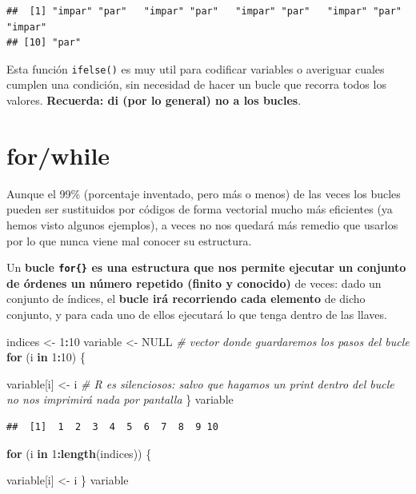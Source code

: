 \documentclass[11pt,]{book}
\newenvironment{Shaded}{\begin{snugshade}}{\end{snugshade}}
\newcommand{\CommentTok}[1]{\textcolor[rgb]{0.37,0.37,0.37}{\textit{#1}}}
\newcommand{\ControlFlowTok}[1]{\textcolor[rgb]{0.27,0.27,0.27}{\textbf{#1}}}
\newcommand{\DecValTok}[1]{\textcolor[rgb]{0.06,0.06,0.06}{#1}}
\newcommand{\KeywordTok}[1]{\textcolor[rgb]{0.27,0.27,0.27}{\textbf{#1}}}
\newcommand{\NormalTok}[1]{#1}
\newcommand{\OperatorTok}[1]{\textcolor[rgb]{0.43,0.43,0.43}{\textbf{#1}}}
\newcommand{\OtherTok}[1]{\textcolor[rgb]{0.37,0.37,0.37}{#1}}
\newcommand{\StringTok}[1]{\textcolor[rgb]{0.5,0.5,0.5}{#1}}
\begin{document}
\begin{verbatim}
##  [1] "impar" "par"   "impar" "par"   "impar" "par"   "impar" "par"   "impar"
## [10] "par"
\end{verbatim}

Esta función \texttt{ifelse()} es muy util para codificar variables o averiguar cuales cumplen una condición, sin necesidad de hacer un bucle que recorra todos los valores. \textbf{Recuerda: di (por lo general) no a los bucles}.

\hypertarget{forwhile}{%
\section{for/while}\label{forwhile}}

Aunque el 99\% (porcentaje inventado, pero más o menos) de las veces los bucles pueden ser sustituidos por códigos de forma vectorial mucho más eficientes (ya hemos visto algunos ejemplos), a veces no nos quedará más remedio que usarlos por lo que nunca viene mal conocer su estructura.

Un \textbf{bucle \texttt{for\{\}} es una estructura que nos permite ejecutar un conjunto de órdenes un número repetido (finito y conocido)} de veces: dado un conjunto de índices, el \textbf{bucle irá recorriendo cada elemento} de dicho conjunto, y para cada uno de ellos ejecutará lo que tenga dentro de las llaves.

\begin{Shaded}
\begin{Highlighting}[]
\NormalTok{indices <-}\StringTok{ }\DecValTok{1}\OperatorTok{:}\DecValTok{10}
\NormalTok{variable <-}\StringTok{ }\OtherTok{NULL} \CommentTok{# vector donde guardaremos los pasos del bucle}
\ControlFlowTok{for}\NormalTok{ (i }\ControlFlowTok{in} \DecValTok{1}\OperatorTok{:}\DecValTok{10}\NormalTok{) \{ }
  
\NormalTok{  variable[i] <-}\StringTok{ }\NormalTok{i }\CommentTok{# R es silenciosos: salvo que hagamos un print dentro del bucle no nos imprimirá nada por pantalla}
\NormalTok{\}}
\NormalTok{variable}
\end{Highlighting}
\end{Shaded}

\begin{verbatim}
##  [1]  1  2  3  4  5  6  7  8  9 10
\end{verbatim}

\begin{Shaded}
\begin{Highlighting}[]
\ControlFlowTok{for}\NormalTok{ (i }\ControlFlowTok{in} \DecValTok{1}\OperatorTok{:}\KeywordTok{length}\NormalTok{(indices)) \{ }
  
\NormalTok{  variable[i] <-}\StringTok{ }\NormalTok{i}
\NormalTok{\}}
\NormalTok{variable}
\end{Highlighting}
\end{Shaded}
\end{document}
